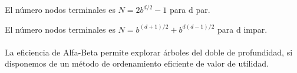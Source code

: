 El número nodos terminales es $N=2b^{d/2} - 1$ para d par.

El número nodos terminales es $N=b^{(d+1)/2}+b^{d(d-1)/2}$ para d impar.
\\\\
La eficiencia de Alfa-Beta permite explorar árboles del doble de profundidad, si disponemos de un método de ordenamiento eficiente de valor de utilidad.

